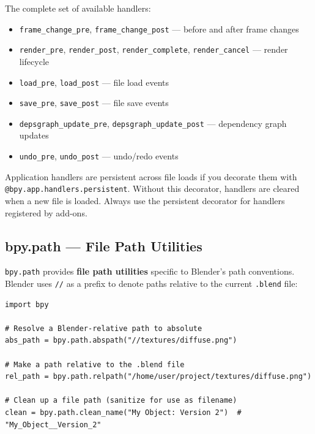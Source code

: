 The complete set of available handlers:

\begin{itemize}[leftmargin=2em]
  \item \texttt{frame\_change\_pre}, \texttt{frame\_change\_post} --- before and after frame changes
  \item \texttt{render\_pre}, \texttt{render\_post}, \texttt{render\_complete}, \texttt{render\_cancel} --- render lifecycle
  \item \texttt{load\_pre}, \texttt{load\_post} --- file load events
  \item \texttt{save\_pre}, \texttt{save\_post} --- file save events
  \item \texttt{depsgraph\_update\_pre}, \texttt{depsgraph\_update\_post} --- dependency graph updates
  \item \texttt{undo\_pre}, \texttt{undo\_post} --- undo/redo events
\end{itemize}

\begin{tipbox}
Application handlers are persistent across file loads if you decorate them with \texttt{@bpy.app.handlers.persistent}. Without this decorator, handlers are cleared when a new file is loaded. Always use the persistent decorator for handlers registered by add-ons.
\end{tipbox}

\subsection{bpy.path --- File Path Utilities}

\texttt{bpy.path} provides \textbf{file path utilities} specific to Blender's path conventions. Blender uses \texttt{//} as a prefix to denote paths relative to the current \texttt{.blend} file:

\begin{lstlisting}
import bpy

# Resolve a Blender-relative path to absolute
abs_path = bpy.path.abspath("//textures/diffuse.png")

# Make a path relative to the .blend file
rel_path = bpy.path.relpath("/home/user/project/textures/diffuse.png")

# Clean up a file path (sanitize for use as filename)
clean = bpy.path.clean_name("My Object: Version 2")  # "My_Object__Version_2"
\end{lstlisting}


